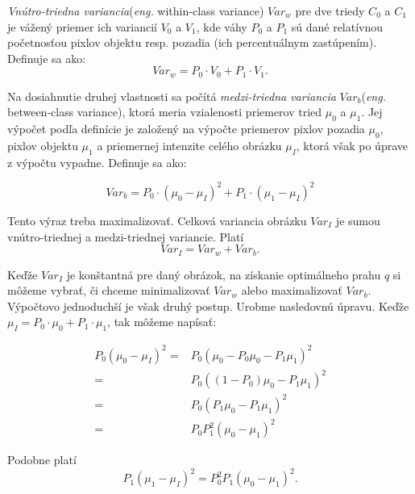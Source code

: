 \documentclass[a4paper,11pt,oneside]{article}%
\begin{document}
\textit{Vnútro-triedna variancia}(\textit{eng.} within-class variance) $Var_w$ pre dve triedy $C_0$ a $C_1$ je vážený priemer ich variancií $V_0 $ a $ V_1 $, kde váhy $P_0$ a $P_1$ sú dané relatívnou početnosťou pixlov objektu resp. pozadia (ich percentuálnym zastúpením). 
 Definuje sa ako:
\begin{equation}
Var_w= P_0 \cdot V_0 + P_1\cdot V_1.
\end{equation}

Na dosiahnutie druhej vlastnosti sa počítá \textit{medzi-triedna variancia} $ Var_b $(\textit{eng.} between-class variance), ktorá meria vzialenosti priemerov tried $ \mu_0$ a $\mu_1 $. Jej výpočet podľa definície je založený na výpočte priemerov pixlov pozadia $\mu_0 $, pixlov objektu $\mu_1 $ a priemernej intenzite celého obrázku $\mu_I $, ktorá však po úprave z výpočtu vypadne. Definuje sa ako:

\begin{equation}
Var_b= P_0 \cdot  (\mu_0-\mu_I)^2 + P_1 \cdot (\mu_1-\mu_I)^2
\end{equation}

Tento výraz treba maximalizovať. 
Celková variancia obrázku $ Var_I $ je sumou vnútro-triednej a medzi-triednej variancie. Platí
$$ Var_I=Var_w+Var_b. $$

Keďže $Var_I $ je konštantná pre daný obrázok, na získanie optimálneho prahu $ q $  si môžeme vybrať, či chceme minimalizovať $Var_w $ alebo maximalizovať $ Var_b $. Výpočtovo jednoduchší je však druhý postup.  Urobme nasledovnú úpravu. Keďže $ \mu_I=P_0\cdot \mu_0 +P_1\cdot \mu_1 $, tak môžeme napísať:

\begin{equation}
\begin{aligned}
P_0 (\mu_0-\mu_I )^2= & P_0 (\mu_0-P_0 \mu_0-P_1 \mu_1 )^2 \\
			        = & P_0 ((1-P_0 ) \mu_0-P_1 \mu_1 )^2 \\
			        = & P_0 (P_1 \mu_0-P_1 \mu_1 )^2 \\
			        = & P_0 P_1^2(\mu_0-\mu_1 )^2
\end{aligned}
\end{equation}

Podobne platí
\begin{equation}
P_1 (\mu_1-\mu_I )^2= P_0^2 P_1(\mu_0-\mu_1 )^2.
\end{equation}
\end{document}
